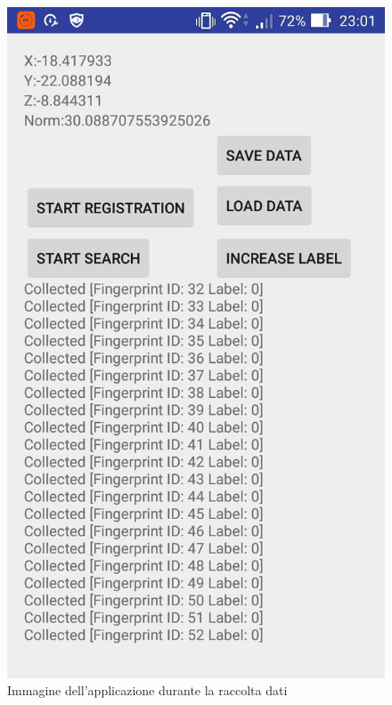 \begin{figure}[H]
	\centering
	\includegraphics[width=0.7\linewidth]{img/app1}
	\caption{Immagine dell'applicazione durante la raccolta dati}
	\label{fig:app1}
\end{figure}


